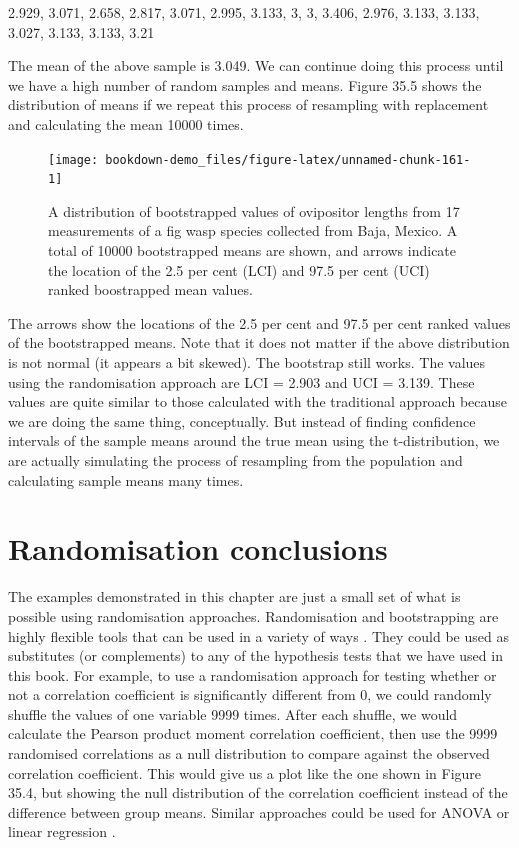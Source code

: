 \documentclass[
  openany]{scrbook}
\begin{document}
2.929, 3.071, 2.658, 2.817, 3.071, 2.995, 3.133, 3, 3, 3.406, 2.976, 3.133, 3.133, 3.027, 3.133, 3.133, 3.21

The mean of the above sample is 3.049.
We can continue doing this process until we have a high number of random samples and means. Figure 35.5 shows the distribution of means if we repeat this process of resampling with replacement and calculating the mean 10000 times.

\begin{figure}
\texttt{[image: bookdown-demo\_files/figure-latex/unnamed-chunk-161-1]} \caption{A distribution of bootstrapped values of ovipositor lengths from 17 measurements of a fig wasp species collected from Baja, Mexico. A total of 10000 bootstrapped means are shown, and arrows indicate the location of the 2.5 per cent (LCI) and 97.5 per cent (UCI) ranked boostrapped mean values.}\label{fig:unnamed-chunk-161}
\end{figure}

The arrows show the locations of the 2.5 per cent and 97.5 per cent ranked values of the bootstrapped means.
Note that it does not matter if the above distribution is not normal (it appears a bit skewed).
The bootstrap still works.
The values using the randomisation approach are LCI = 2.903 and UCI = 3.139.
These values are quite similar to those calculated with the traditional approach because we are doing the same thing, conceptually.
But instead of finding confidence intervals of the sample means around the true mean using the t-distribution, we are actually simulating the process of resampling from the population and calculating sample means many times.

\hypertarget{randomisation-conclusions}{%
\section{Randomisation conclusions}\label{randomisation-conclusions}}

The examples demonstrated in this chapter are just a small set of what is possible using randomisation approaches.
Randomisation and bootstrapping are highly flexible tools that can be used in a variety of ways \citep{Manly2007}.
They could be used as substitutes (or complements) to any of the hypothesis tests that we have used in this book.
For example, to use a randomisation approach for testing whether or not a correlation coefficient is significantly different from 0, we could randomly shuffle the values of one variable 9999 times.
After each shuffle, we would calculate the Pearson product moment correlation coefficient, then use the 9999 randomised correlations as a null distribution to compare against the observed correlation coefficient.
This would give us a plot like the one shown in Figure 35.4, but showing the null distribution of the correlation coefficient instead of the difference between group means.
Similar approaches could be used for ANOVA or linear regression \citep{Manly2007}.
\end{document}
